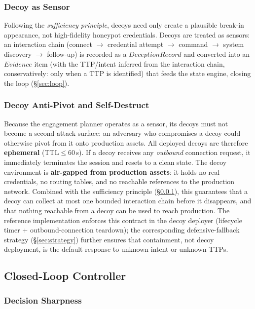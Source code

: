\documentclass[11pt]{article}
\begin{document}
\subsubsection{Decoy as Sensor}
\label{sec:decoy-mapping}

Following the \textit{sufficiency principle}, decoys need only create a
plausible break-in appearance, not high-fidelity honeypot credentials.
Decoys are treated as sensors: an interaction chain (connect $\to$
credential attempt $\to$ command $\to$ system discovery $\to$ follow-up) is
recorded as a $\mathit{DeceptionRecord}$ and converted into an
$\mathit{Evidence}$ item (with the TTP/intent inferred from the interaction
chain, conservatively: only when a TTP is identified) that feeds the state
engine, closing the loop (\S\ref{sec:loop}).

\subsubsection{Decoy Anti-Pivot and Self-Destruct}
\label{sec:anti-pivot}

Because the engagement planner operates as a sensor, its decoys must not
become a second attack surface: an adversary who compromises a decoy could
otherwise pivot from it onto production assets. All deployed decoys are
therefore \textbf{ephemeral} ($\mathrm{TTL} \leq 60$\,s). If a decoy
receives any \textit{outbound} connection request, it immediately terminates
the session and resets to a clean state. The decoy environment is
\textbf{air-gapped from production assets}: it holds no real credentials, no
routing tables, and no reachable references to the production network.
Combined with the sufficiency principle (\S\ref{sec:decoy-mapping}), this
guarantees that a decoy can collect at most one bounded interaction chain
before it disappears, and that nothing reachable from a decoy can be used to
reach production. The reference implementation enforces this contract in the
decoy deployer (lifecycle timer + outbound-connection teardown); the
corresponding defensive-fallback strategy (\S\ref{sec:strategy}) further
ensures that containment, not decoy deployment, is the default response to
unknown intent or unknown TTPs.

\subsection{Closed-Loop Controller}
\label{sec:controller}

\subsubsection{Decision Sharpness}
\label{sec:sharpness-formal}
\end{document}
